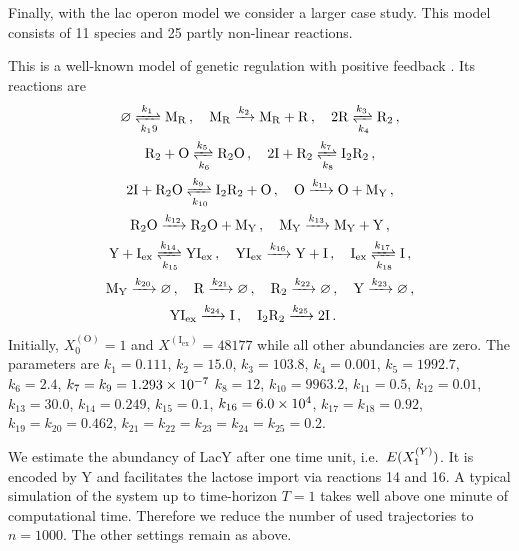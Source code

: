 Finally, with the lac operon model we consider a larger case study. This model consists of 11 species and 25 partly non-linear reactions.
\begin{model}\label{model:lac}This is a well-known model of genetic regulation with positive feedback \parencite{stamatakis2009comparison}. Its reactions are
 \begin{gather*}
 \varnothing \xrightleftharpoons[k_19]{k_1} \mathrm{M_R}\,, \quad
 \mathrm{M_R} \xrightarrow{k_2} \mathrm{M_R + R}\,,\quad
 2 \mathrm{R} \xrightleftharpoons[k_4]{k_3} \mathrm{R_2}\,,\\
 \mathrm{R_2 + O} \xrightleftharpoons[k_6]{k_5}\mathrm{ R_2O}\,,\quad
 \mathrm{2 I + R_2} \xrightleftharpoons[k_8]{k_7} \mathrm{I_2R_2}\,,\\
\mathrm{2I +R_2O} \xrightleftharpoons[k_{10}]{k_9} \mathrm{I_2R_2 + O}\,,\quad
\mathrm{O}\xrightarrow{k_{11}} \mathrm{O + M_Y}\,,\\
\mathrm{R_2O}\xrightarrow{k_{12}}\mathrm{R_2O+M_Y}\,,\quad
\mathrm{M_Y} \xrightarrow{k_{13}}\mathrm{M_Y + Y}\,,\\
\mathrm{Y + I_{{ex}}}\xrightleftharpoons[k_{15}]{k_{14}}\mathrm{YI_{{ex}}}\,,\quad
\mathrm{YI_{{ex}}}\xrightarrow{k_{16}}\mathrm{Y+I}\,,\quad
\mathrm{I_{{ex}}}\xrightleftharpoons[k_{18}]{k_{17}}\mathrm{I}\,,\\
\mathrm{M_Y}\xrightarrow{k_{20}}\varnothing\,,\quad
\mathrm{R}\xrightarrow{k_{21}}\varnothing\,,\quad
\mathrm{R_2}\xrightarrow{k_{22}}\varnothing\,,\quad
\mathrm{Y}\xrightarrow{k_{23}}\varnothing\,,\\
\mathrm{YI_{ex}}\xrightarrow{k_{24}}\mathrm{I}\,,\quad
\mathrm{I_2R_2}\xrightarrow{k_{25}}\mathrm{2I}\,.\quad
\end{gather*}
Initially, $X^{(\mathrm{O})}_0=1$ and $X^{(\mathrm{I_{{ex}}})}=\num{48177}$ while all other abundancies are zero.
The parameters are $
  k_1  = 0.111$,
 $ k_2  = 15.0$,
  $k_3  = 103.8$,
  $k_4  = \num{0.001}$,
  $k_5  = 1992.7$,
  $k_6  = 2.4$,
  $k_7 =k_9  = \num{1.293d-7}$
  $k_8  = 12$,
  $k_{10} = 9963.2$,
  $k_{11} = 0.5$,
  $k_{12} = 0.01$,
  $k_{13} = 30.0$,
  $k_{14} = 0.249$,
  $k_{15} = 0.1$,
  $k_{16} = \num{6.0d4}$,
  $k_{17} =k_{18} = 0.92$,
  $k_{19} = k_{20} = 0.462$,
  $k_{21}=k_{22}= k_{23} = k_{24} = k_{25} = 0.2$.
\end{model}
We estimate the abundancy of LacY after one time unit, i.e.\ ${E}(X^{(Y)}_1)$.
It is encoded by Y and facilitates
the lactose import via reactions 14 and 16.
A typical simulation of the system up to time-horizon $T=1$ takes well above one minute of computational time.
Therefore we reduce the number of used trajectories to $n=1000$.
The other settings remain as above.

